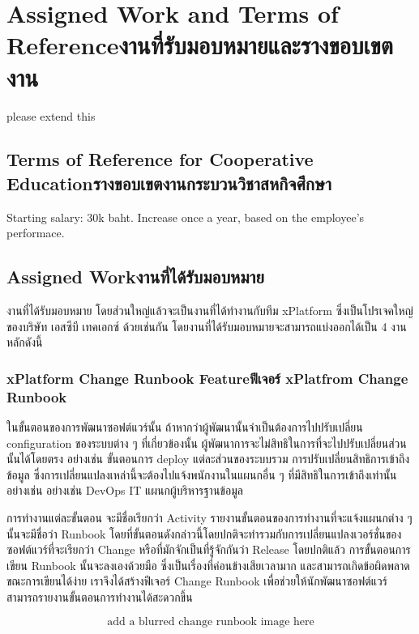 \chapter{\ifenglish Assigned Work and Terms of Reference\else งานที่รับมอบหมายและรางขอบเขตงาน\fi}
please extend this


\section{\ifenglish Terms of Reference for Cooperative Education\else รางขอบเขตงานกระบวนวิชาสหกิจศึกษา \fi}
Starting salary: 30k baht. Increase once a year, based on the employee's performace.

\section{\ifenglish Assigned Work\else งานที่ได้รับมอบหมาย \fi}
งานที่ได้รับมอบหมาย โดยส่วนใหญ่แล้วจะเป็นงานที่ได้ทำงานกับทีม xPlatform ซึ่งเป็นโปรเจคใหญ่ของบริษัท เอสซีบี เทคเอกซ์ ด้วยเช่นกัน โดยงานที่ได้รับมอบหมายจะสามารถแบ่งออกได้เป็น 4 งานหลักดังนี้

\subsection{\ifenglish xPlatform Change Runbook​ Feature\else ฟีเจอร์ xPlatfrom Change Runbook\fi}
ในขั้นตอนของการพัฒนาซอฟต์แวร์นั้น ถ้าหากว่าผู้พัฒนานั้นจำเป็นต้องการไปปรับเปลี่ยน configuration ของระบบต่าง ๆ ที่เกี่ยวข้องนั้น ผู้พัฒนาการจะไม่สิทธิในการที่จะไปปรับเปลี่ยนส่วนนั้นได้โดยตรง อย่างเช่น ขั้นตอนการ deploy แต่ละส่วนของระบบรวม การปรับเปลี่ยนสิทธิการเข้าถึงข้อมูล ซึ่งการเปลี่ยนแปลงเหล่านี้จะต้องไปแจ้งพนักงานในแผนกอื่น ๆ ที่มีสิทธิในการเข้าถึงเท่านั้นอย่างเช่น อย่างเช่น DevOps IT แผนกผู้บริหารฐานข้อมูล 

การทำงานแต่ละขั้นตอน จะมีชื่อเรียกว่า Activity รายงานขั้นตอนของการทำงานที่จะแจ้งแผนกต่าง ๆ นั้นจะมีชื่อว่า Runbook โดยที่ขั้นตอนดังกล่าวนี้โดยปกติจะทำรวมกับการเปลี่ยนแปลงเวอร์ชั่นของซอฟต์แวร์ที่จะเรียกว่า Change หรือที่มักจักเป็นที่รู้จักกันว่า Release โดยปกติแล้ว การขั้นตอนการเขียน Runbook นั้นจะลงเองด้วยมือ ซึ่งเป็นเรื่องที่ค่อนข้างเสียเวลามาก และสามารถเกิดข้อผิดพลาดขณะการเขียนได้ง่าย เราจึงได้สร้างฟีเจอร์ Change Runbook เพื่อช่วยให้นักพัฒนาซอฟต์แวร์สามารถรายงานขั้นตอนการทำงานได้สะดวกขึ้น

\[\text{add a blurred change runbook image here}\]

